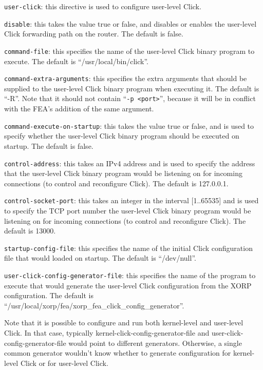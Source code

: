 \begin{description}
\begin{description}
\item{\tt user-click}: this directive is used to configure user-level
  Click.
\begin{description}
\item{\tt disable}: this takes the value {\stt true} or {\stt false},
  and disables or enables the user-level Click forwarding path on the
  router. The default is {\stt false}.
\item{\tt command-file}: this specifies the name of the user-level
  Click binary program to execute. The default is
  ``/usr/local/bin/click''.
\item{\tt command-extra-arguments}: this specifies the extra arguments
  that should be supplied to the user-level Click binary program when
  executing it. The default is ``-R''. Note that it should not contain
  ``\verb=-p <port>='', because it will be in conflict with the FEA's
  addition of the same argument.
\item{\tt command-execute-on-startup}: this takes the value {\stt true}
  or {\stt false}, and is used to specify whether the user-level Click
  binary program should be executed on startup. The default is {\stt
  false}.
\item{\tt control-address}: this takes an IPv4 address and is used to
  specify the address that the user-level Click binary program would be
  listening on for incoming connections (to control and reconfigure
  Click). The default is 127.0.0.1.
\item{\tt control-socket-port}: this takes an integer in the interval
  [1..65535] and is used to specify the TCP port number the user-level
  Click binary program would be listening on for incoming connections
  (to control and reconfigure Click). The default is 13000.
\item{\tt startup-config-file}: this specifies the name of the initial
  Click configuration file that would loaded on startup. The default is
  ``/dev/null''.
\item{\tt user-click-config-generator-file}: this specifies the name
  of the program to execute that would generate the user-level Click
  configuration from the XORP configuration. The default is
  ``/usr/local/xorp/fea/xorp\_fea\_click\_config\_generator''.
\end{description}

Note that it is possible to configure and run both kernel-level and
user-level Click. In that case, typically
{\stt kernel-click-config-generator-file} and
{\stt user-click-config-generator-file} would point to different
generators. Otherwise, a single common generator wouldn't know whether
to generate configuration for kernel-level Click or for user-level
Click.


\end{description}
\end{description}
